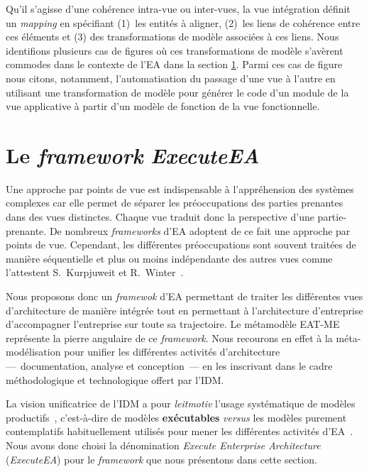 Qu'il s’agisse d'une cohérence intra-vue ou inter-vues, la vue intégration définit un \textit{mapping} en spécifiant
(1)~les entités à aligner, (2)~les liens de cohérence entre ces éléments et (3) des transformations de modèle
associées à ces liens. Nous identifions plusieurs cas de figures où ces transformations de modèle s'avèrent commodes
dans le contexte de l'EA dans la section \ref{sec:executeea}. Parmi ces cas de figure nous citons, notamment,
l'automatisation du passage d'une vue à l'autre en utilisant une transformation de modèle pour générer le code
d'un module de la vue applicative à partir d'un modèle de fonction de la vue fonctionnelle.

\section[Le framework ExecuteEA]{Le \emph{framework} \emph{ExecuteEA}}
\label{sec:executeea}
    

    Une approche par points de vue est indispensable à l’appréhension des systèmes complexes car elle permet de séparer
    les préoccupations des parties prenantes dans des vues distinctes. Chaque vue traduit donc la perspective d'une partie-prenante.
    De nombreux \emph{frameworks} d'EA adoptent de ce fait une approche par points de vue. Cependant, les différentes préoccupations
    sont souvent traitées de manière séquentielle et plus ou moins indépendante des autres vues comme l'attestent
    S.~Kurpjuweit et R.~Winter~\cite{kurpjuweit2007viewpoint}.

    Nous proposons donc un \emph{framewok} d'EA permettant de traiter
    les différentes vues d'architecture de manière intégrée tout en permettant à l'architecture d'entreprise d'accompagner l'entreprise
    sur toute sa trajectoire.  Le métamodèle EAT-ME représente la pierre angulaire de ce \emph{framework}.
    Nous recourons en effet à la méta-modélisation pour unifier les différentes activités
    d'architecture —~documentation, analyse et conception~—
    en les inscrivant dans le cadre méthodologique et technologique offert par l'IDM.

    La vision unificatrice de l'IDM a pour \emph{leitmotiv} l'usage systématique de modèles productifs~\cite{2005unification}, c'est-à-dire
    de modèles \textbf{exécutables} \emph{versus} les modèles purement contemplatifs habituellement utilisés pour mener 
    les différentes activités d'EA~\cite{kulkarni2013modelling}. Nous avons donc choisi la dénomination \emph{Execute Enterprise Architecture} (\emph{ExecuteEA}) pour le \emph{framework} que nous présentons dans cette section.

